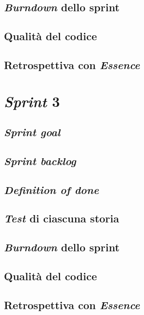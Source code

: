 \documentclass{article}
\begin{document}
\subsection{\emph{Burndown} dello sprint}

\subsection{Qualità del codice}

\subsection{Retrospettiva con \emph{Essence}}

\section{\emph{Sprint} 3}

\subsection{\emph{Sprint goal}}

\subsection{\emph{Sprint backlog}}

\subsection{\emph{Definition of done}}

\subsection{\emph{Test} di ciascuna storia}

\subsection{\emph{Burndown} dello sprint}

\subsection{Qualità del codice}

\subsection{Retrospettiva con \emph{Essence}}
\end{document}
